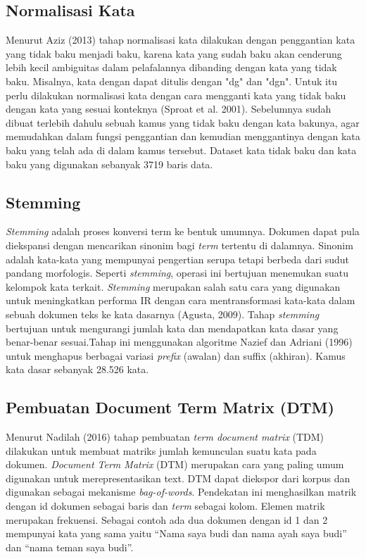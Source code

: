 \subsection*{Normalisasi Kata}

Menurut Aziz (2013) tahap normalisasi kata dilakukan dengan penggantian kata yang tidak baku menjadi baku, karena kata yang sudah baku akan cenderung lebih kecil ambiguitas dalam pelafalannya dibanding dengan kata yang tidak baku. Misalnya, kata dengan dapat ditulis dengan "dg" dan "dgn".  Untuk itu perlu dilakukan normalisasi kata dengan cara mengganti kata yang tidak baku dengan kata yang sesuai konteknya (Sproat et al. 2001). Sebelumnya sudah dibuat terlebih dahulu sebuah kamus yang tidak baku dengan kata bakunya, agar memudahkan dalam fungsi penggantian dan kemudian menggantinya dengan kata baku yang telah ada di dalam kamus tersebut. Dataset kata tidak baku dan kata baku yang digunakan sebanyak 3719 baris data. 

\subsection*{Stemming}

\textit{Stemming} adalah  proses  konversi term ke bentuk  umumnya. Dokumen dapat pula diekspansi dengan mencarikan  sinonim  bagi \textit{term} tertentu di  dalamnya. Sinonim adalah kata-kata yang mempunyai pengertian serupa tetapi berbeda dari sudut pandang morfologis. Seperti \textit{stemming},  operasi ini bertujuan menemukan suatu kelompok kata terkait.
\textit{Stemming} merupakan salah satu cara yang digunakan untuk meningkatkan performa IR dengan cara mentransformasi kata-kata dalam sebuah dokumen teks ke kata dasarnya (Agusta, 2009). Tahap \textit{stemming} bertujuan untuk mengurangi jumlah kata dan mendapatkan kata dasar yang benar-benar sesuai.Tahap ini menggunakan algoritme Nazief dan Adriani (1996) untuk menghapus berbagai variasi \textit{prefix} (awalan) dan suffix (akhiran). Kamus kata dasar sebanyak 28.526 kata.

\subsection*{Pembuatan Document Term Matrix (DTM)}

Menurut Nadilah (2016) tahap pembuatan \textit{term document matrix} (TDM) dilakukan untuk membuat matriks jumlah kemunculan suatu kata pada dokumen. \textit{Document Term Matrix} (DTM) merupakan cara yang paling umum digunakan untuk merepresentasikan text. DTM dapat diekspor dari korpus dan digunakan sebagai mekanisme \textit{bag-of-words}. Pendekatan ini menghasilkan matrik dengan id dokumen sebagai baris dan \textit{term} sebagai kolom. Elemen matrik merupakan frekuensi.
Sebagai contoh ada dua dokumen dengan id 1 dan 2 mempunyai kata yang sama yaitu “Nama saya budi dan nama ayah saya budi” dan “nama teman saya budi”.

